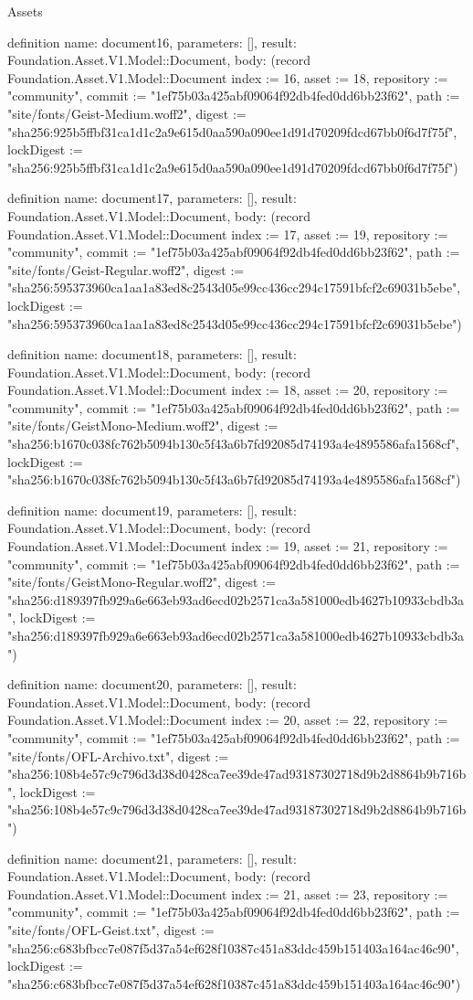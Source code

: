 \begin{lexlean}{Assets}
\begin{semanticmodule}
definition{
  name: document16,
  parameters: [],
  result: Foundation.Asset.V1.Model::Document,
  body: (record Foundation.Asset.V1.Model::Document {index := 16, asset := 18, repository := "community", commit := "1ef75b03a425abf09064f92db4fed0dd6bb23f62", path := "site/fonts/Geist-Medium.woff2", digest := "sha256:925b5ffbf31ca1d1c2a9e615d0aa590a090ee1d91d70209fdcd67bb0f6d7f75f", lockDigest := "sha256:925b5ffbf31ca1d1c2a9e615d0aa590a090ee1d91d70209fdcd67bb0f6d7f75f"})
}

definition{
  name: document17,
  parameters: [],
  result: Foundation.Asset.V1.Model::Document,
  body: (record Foundation.Asset.V1.Model::Document {index := 17, asset := 19, repository := "community", commit := "1ef75b03a425abf09064f92db4fed0dd6bb23f62", path := "site/fonts/Geist-Regular.woff2", digest := "sha256:595373960ca1aa1a83ed8c2543d05e99cc436cc294c17591bfcf2c69031b5ebe", lockDigest := "sha256:595373960ca1aa1a83ed8c2543d05e99cc436cc294c17591bfcf2c69031b5ebe"})
}

definition{
  name: document18,
  parameters: [],
  result: Foundation.Asset.V1.Model::Document,
  body: (record Foundation.Asset.V1.Model::Document {index := 18, asset := 20, repository := "community", commit := "1ef75b03a425abf09064f92db4fed0dd6bb23f62", path := "site/fonts/GeistMono-Medium.woff2", digest := "sha256:b1670c038fc762b5094b130c5f43a6b7fd92085d74193a4e4895586afa1568cf", lockDigest := "sha256:b1670c038fc762b5094b130c5f43a6b7fd92085d74193a4e4895586afa1568cf"})
}

definition{
  name: document19,
  parameters: [],
  result: Foundation.Asset.V1.Model::Document,
  body: (record Foundation.Asset.V1.Model::Document {index := 19, asset := 21, repository := "community", commit := "1ef75b03a425abf09064f92db4fed0dd6bb23f62", path := "site/fonts/GeistMono-Regular.woff2", digest := "sha256:d189397fb929a6e663eb93ad6ecd02b2571ca3a581000edb4627b10933cbdb3a", lockDigest := "sha256:d189397fb929a6e663eb93ad6ecd02b2571ca3a581000edb4627b10933cbdb3a"})
}

definition{
  name: document20,
  parameters: [],
  result: Foundation.Asset.V1.Model::Document,
  body: (record Foundation.Asset.V1.Model::Document {index := 20, asset := 22, repository := "community", commit := "1ef75b03a425abf09064f92db4fed0dd6bb23f62", path := "site/fonts/OFL-Archivo.txt", digest := "sha256:108b4e57c9c796d3d38d0428ca7ee39de47ad93187302718d9b2d8864b9b716b", lockDigest := "sha256:108b4e57c9c796d3d38d0428ca7ee39de47ad93187302718d9b2d8864b9b716b"})
}

definition{
  name: document21,
  parameters: [],
  result: Foundation.Asset.V1.Model::Document,
  body: (record Foundation.Asset.V1.Model::Document {index := 21, asset := 23, repository := "community", commit := "1ef75b03a425abf09064f92db4fed0dd6bb23f62", path := "site/fonts/OFL-Geist.txt", digest := "sha256:c683bfbcc7e087f5d37a54ef628f10387c451a83ddc459b151403a164ac46c90", lockDigest := "sha256:c683bfbcc7e087f5d37a54ef628f10387c451a83ddc459b151403a164ac46c90"})
}


\end{semanticmodule}
\end{lexlean}
